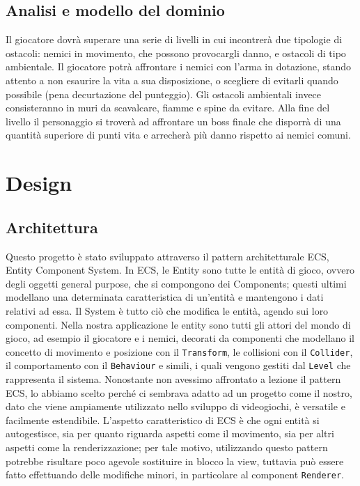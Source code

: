 \documentclass{article}
\begin{document}
\subsection{Analisi e modello del dominio}
Il giocatore dovrà superare una serie di livelli in cui incontrerà due tipologie di ostacoli: nemici in movimento, che possono provocargli danno, e ostacoli di tipo ambientale.
Il giocatore potrà affrontare i nemici con l'arma in dotazione, stando attento a non esaurire la vita a sua disposizione, o scegliere di evitarli quando possibile (pena decurtazione del punteggio).
Gli ostacoli ambientali invece consisteranno in muri da scavalcare, fiamme e spine da evitare.
Alla fine del livello il personaggio si troverà ad affrontare un boss finale che disporrà di una quantità superiore di punti vita e arrecherà più danno rispetto ai nemici comuni.


\section{Design}
\subsection{Architettura}
Questo progetto è stato sviluppato attraverso il pattern architetturale ECS, Entity Component System.
In ECS, le Entity sono tutte le entità di gioco, ovvero degli oggetti general purpose, che si compongono dei Components; questi ultimi modellano una determinata caratteristica di un'entità e mantengono i dati relativi ad essa. Il System è tutto ciò che modifica le entità, agendo sui loro componenti. Nella nostra applicazione le entity sono tutti gli attori del mondo di gioco, ad esempio il giocatore e i nemici, decorati da componenti che modellano il concetto di movimento e posizione con il \texttt{Transform}, le collisioni con il \texttt{Collider}, il comportamento con il \texttt{Behaviour} e simili, i quali vengono gestiti dal \texttt{Level} che rappresenta il sistema.
Nonostante non avessimo affrontato a lezione il pattern ECS, lo abbiamo scelto perché ci sembrava adatto ad un progetto come il nostro, dato che viene ampiamente utilizzato nello sviluppo di videogiochi, è versatile e facilmente estendibile.
L'aspetto caratteristico di ECS è che ogni entità si autogestisce, sia per quanto riguarda aspetti come il movimento, sia per altri aspetti come la renderizzazione; per tale motivo, utilizzando questo pattern potrebbe risultare poco agevole sostituire in blocco la view, tuttavia può essere fatto effettuando delle modifiche minori, in particolare al component \texttt{Renderer}.
\end{document}
